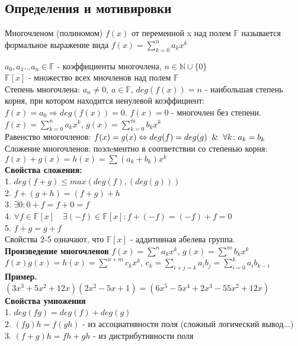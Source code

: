 \subsection{Определения и мотивировки}
\begin{defin}
Многочленом (полиномом) $f(x)$ от переменной x над полем $\mathbb F$
называется формальное выражение вида $f(x)=\sum\limits_{k=0}^{n}a_kx^k$
\end{defin}
$a_0,a_1\ldots a_n \in \mathbb F$ - коэффициенты многочлена,
$n\in \mathbb N\cup \{0\}$\\
$\mathbb F[x]$ - множество всех мночленов над полем $\mathbb F$\\
Степень многочлена: $a_n\ne0$, $a\in \mathbb F$, $deg(f(x))=n$ -
наибольшая степень корня, при котором находится ненулевой
коэффициент:
$f(x)=a_0\Rightarrow deg(f(x))=0$. $f(x)=0$ - многочлен без
степени.\\
$f(x)=\sum\limits^n_{k=0} a_kx^k$, $g(x)=\sum\limits^m_{k=0} b_kx^k$\\
Равенство многочленов:
$f(x)=g(x)\Leftrightarrow deg(f)=deg(g) \And \forall k\colon a_k=b_k$\\
Сложение многочленов: поэлeментно в соответствии со степенью корня:
$f(x)+g(x)=h(x)=\sum(a_k+b_k)x^k$\\
\textbf{Свойства сложения:}\\
1. $deg(f+g)\leqslant max(deg(f),(deg(g)))$\\
2. $f+(g+h)=(f+g)+h$\\
3. $\exists 0\colon 0+f=f+0=f$\\
4. $\forall f\in \mathbb F[x] \quad\exists (-f) \in \mathbb F[x]:
f+(-f)=(-f)+f=0$\\
5. $f+g=g+f$\\
Свойства 2-5 означают, что $\mathbb F[x]$ - аддитивная абелева группа.\\
\textbf{Произведение многочленов}
$f(x)=\sum\limits^n a_kx^k$, $g(x)=\sum\limits^m b_kx^k$\\
$f(x)g(x)=h(x)=\sum\limits^{n+m}c_kx^k$, $c_k=\sum\limits_{i+j=k}a_ib_j=
\sum\limits_{i=0}^{k}a_ib_{k-i}$\\
\textbf{Пример.} $(3x^3+5x^2+12x)(2x^2-5x+1)=(6x^5-5x^4+2x^3-55x^2+12x)$\\
\textbf{Свойства умножения}\\
1. $deg(fg)=deg(f)+deg(g)$\\
2. $(fg)h=f(gh)$ - из ассоциативности поля (сложный логический
вывод...)\\
3. $(f+g)h=fh+gh$ - из дистрибутивности поля\\
